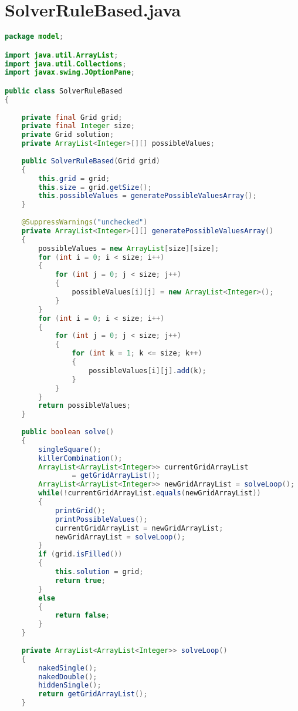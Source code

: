 \section{SolverRuleBased.java}
\label{sec:kodeprogramrb}

\begin{lstlisting}[language=Java,basicstyle=\tiny,caption=SolverRuleBased.java]
package model;

import java.util.ArrayList;
import java.util.Collections;
import javax.swing.JOptionPane;

public class SolverRuleBased
{
    
    private final Grid grid;
    private final Integer size;
    private Grid solution;
    private ArrayList<Integer>[][] possibleValues;
    
    public SolverRuleBased(Grid grid)
    {
        this.grid = grid;
        this.size = grid.getSize();
        this.possibleValues = generatePossibleValuesArray();
    }
    
    @SuppressWarnings("unchecked")
	private ArrayList<Integer>[][] generatePossibleValuesArray()
    {
        possibleValues = new ArrayList[size][size];
        for (int i = 0; i < size; i++)
        {
            for (int j = 0; j < size; j++)
            {
                possibleValues[i][j] = new ArrayList<Integer>();
            }
        }
        for (int i = 0; i < size; i++)
        {
            for (int j = 0; j < size; j++)
            {
                for (int k = 1; k <= size; k++)
                {
                    possibleValues[i][j].add(k);
                }
            }
        }
        return possibleValues;
    }
    
    public boolean solve()
    {
        singleSquare();
        killerCombination();
        ArrayList<ArrayList<Integer>> currentGridArrayList 
                = getGridArrayList();
        ArrayList<ArrayList<Integer>> newGridArrayList = solveLoop();
        while(!currentGridArrayList.equals(newGridArrayList))
        {
            printGrid();
            printPossibleValues();
            currentGridArrayList = newGridArrayList;
            newGridArrayList = solveLoop();
        }
        if (grid.isFilled())
        {
            this.solution = grid;
            return true;
        }
        else
        {
            return false;
        }
    }
    
    private ArrayList<ArrayList<Integer>> solveLoop()
    {
        nakedSingle();
        nakedDouble();
        hiddenSingle();
        return getGridArrayList();
    }
    

\end{lstlisting}
